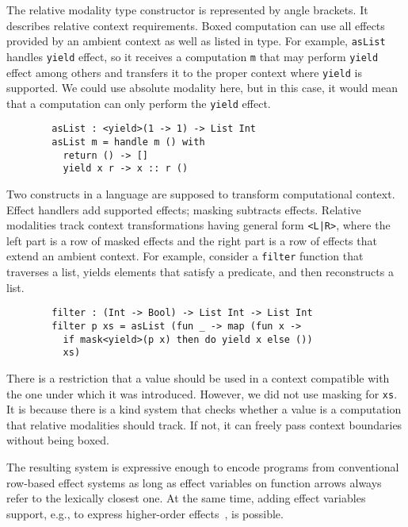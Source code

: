 \documentclass[conference]{IEEEtran}
\begin{document}
    The relative modality type constructor is represented by angle brackets.
    It describes relative context requirements.
    Boxed computation can use all effects provided by an ambient context as well as listed in type.
    For example, \texttt{asList} handles \texttt{yield} effect, so it receives a computation \texttt{m} that may perform \texttt{yield} effect among others and transfers it to the proper context where \texttt{yield} is supported.
    We could use absolute modality here, but in this case, it would mean that a computation can only perform the \texttt{yield} effect.
    \begin{verbatim}
        asList : <yield>(1 -> 1) -> List Int
        asList m = handle m () with
          return () -> []
          yield x r -> x :: r ()
    \end{verbatim}

    Two constructs in a language are supposed to transform computational context.
    Effect handlers add supported effects; masking subtracts effects.
    Relative modalities track context transformations having general form \texttt{<L|R>}, where the left part is a row of masked effects and the right part is a row of effects that extend an ambient context.
    For example, consider a \texttt{filter} function that traverses a list, yields elements that satisfy a predicate, and then reconstructs a list.
    \begin{verbatim}
        filter : (Int -> Bool) -> List Int -> List Int
        filter p xs = asList (fun _ -> map (fun x ->
          if mask<yield>(p x) then do yield x else ())
          xs)
    \end{verbatim}

    There is a restriction that a value should be used in a context compatible with the one under which it was introduced.
    However, we did not use masking for \texttt{xs}.
    It is because there is a kind system that checks whether a value is a computation that relative modalities should track.
    If not, it can freely pass context boundaries without being boxed.

    The resulting system is expressive enough to encode programs from conventional row-based effect systems as long as effect variables on function arrows always refer to the lexically closest one.
    At the same time, adding effect variables support, e.g., to express higher-order effects~\cite{wu2014effect}, is possible.
\end{document}
